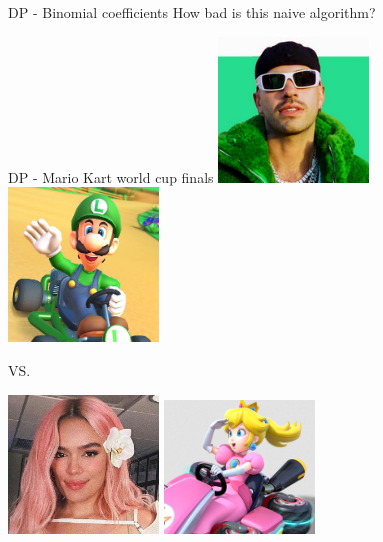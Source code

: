 \documentclass{beamer}
\begin{document}
%

\begin{frame}{DP - Binomial coefficients}
	How bad is this naive algorithm?
\end{frame}

\begin{frame}{DP - Mario Kart world cup finals}
	\centering
	\includegraphics[width=0.3\textwidth]{feid.png}
	\includegraphics[width=0.3\textwidth]{luigi.png}

	VS.

	\medskip
	\includegraphics[width=0.3\textwidth]{karolg.png}
	\includegraphics[width=0.3\textwidth]{peach.png}
\end{frame}
\end{document}
